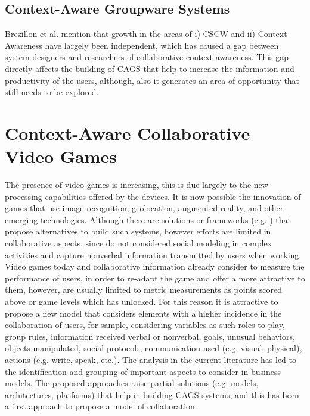 \documentclass{./sty/llncs}
\begin{document}
\subsection{Context-Aware Groupware Systems}

Brezillon et al. \cite{Brezillon08} mention that growth in the areas of i) CSCW and ii) Context-Awareness have largely been independent, which has caused a gap between system designers and researchers of collaborative context awareness. This gap directly affects the building of CAGS that help to increase the information and productivity of the users, although, also it generates an area of opportunity that still needs to be explored.


\section{Context-Aware Collaborative Video Games} %
\label{sec:videogame}
The presence of video games is increasing, this is due largely to the new processing capabilities offered by the devices. It is now possible the innovation of games that use image recognition, geolocation, augmented reality, and other emerging technologies. Although there are solutions or frameworks (e.g. \cite{Diamantaki10,Zea09,Marty11}) that propose alternatives to build such systems, however efforts are limited in collaborative aspects, since do not considered social modeling in complex activities and capture nonverbal information transmitted by users when working. Video games today and collaborative information already consider to measure the performance of users, in order to re-adapt the game and offer a more attractive to them, however, are usually limited to metric measurements as points scored above or game levels which has unlocked. For this reason it is attractive to propose a new model that considers elements with a higher incidence in the collaboration of users, for sample,  considering variables as such roles to play, group rules, information received verbal or nonverbal, goals, unusual behaviors, objects manipulated, social protocols, communication used (e.g. visual, physical), actions (e.g. write, speak, etc.). The analysis in the current literature has led to the identification and grouping of important aspects to consider in business models. The proposed approaches raise partial solutions (e.g. models, architectures, platforms) that help in building CAGS systems, and this has been a first approach to propose a model of collaboration.
\end{document}
